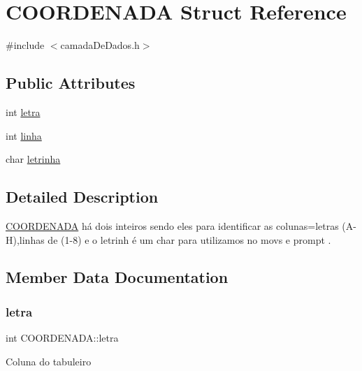 \hypertarget{structCOORDENADA}{}\section{C\+O\+O\+R\+D\+E\+N\+A\+DA Struct Reference}
\label{structCOORDENADA}


{\ttfamily \#include $<$camada\+De\+Dados.\+h$>$}

\subsection*{Public Attributes}
\begin{DoxyCompactItemize}
\item 
int \hyperlink{structCOORDENADA_acb526f8ae91ba6a2742ef1a9473fa2b4}{letra}
\item 
int \hyperlink{structCOORDENADA_aefe14bcc5a066ac3b21500cc3d28c06f}{linha}
\item 
char \hyperlink{structCOORDENADA_ac00ff2e615b371a3d87fbb05449cde99}{letrinha}
\end{DoxyCompactItemize}


\subsection{Detailed Description}
\hyperlink{structCOORDENADA}{C\+O\+O\+R\+D\+E\+N\+A\+DA} há dois inteiros sendo eles para identificar as colunas=letras (A-\/H),linhas de (1-\/8) e o letrinh é um char para utilizamos no movs e prompt . 

\subsection{Member Data Documentation}
\mbox{\label{structCOORDENADA_acb526f8ae91ba6a2742ef1a9473fa2b4}} 
\subsubsection{\texorpdfstring{letra}{letra}}
{\footnotesize\ttfamily int C\+O\+O\+R\+D\+E\+N\+A\+D\+A\+::letra}

Coluna do tabuleiro \mbox{\label{structCOORDENADA_ac00ff2e615b371a3d87fbb05449cde99}} 
